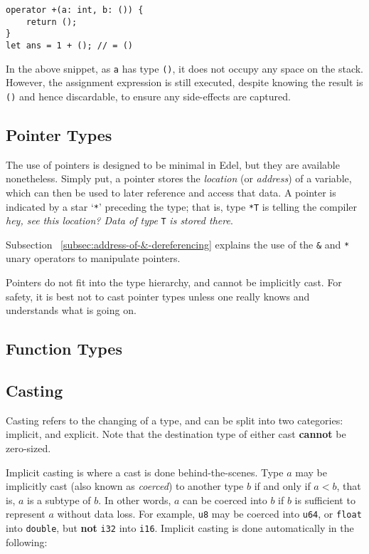\begin{lstlisting}[language=CustomLang]
operator +(a: int, b: ()) {
    return ();
}
let ans = 1 + (); // = ()
\end{lstlisting}

In the above snippet, as \texttt{a} has type \texttt{()}, it does not occupy any space on the stack.
However, the assignment expression is still executed, despite knowing the result is \texttt{()} and hence discardable, to ensure any side-effects are captured.

\subsection{Pointer Types}\label{subsec:pointer-types}

The use of pointers is designed to be minimal in Edel, but they are available nonetheless.
Simply put, a pointer stores the \textit{location} (or \textit{address}) of a variable, which can then be used to later reference and access that data.
A pointer is indicated by a star `\texttt{*}' preceding the type;
that is, type \texttt{*T} is telling the compiler \textit{hey, see this location? Data of type} \texttt{T} \textit{is stored there}.

Subsection ~\ref{subsec:address-of-&-dereferencing} explains the use of the \texttt{\&} and \texttt{*} unary operators to manipulate pointers.

Pointers do not fit into the type hierarchy, and cannot be implicitly cast.
For safety, it is best not to cast pointer types unless one really knows and understands what is going on.

\subsection{Function Types}\label{subsec:function-types}


\subsection{Casting}\label{subsec:type-casting}

Casting refers to the changing of a type, and can be split into two categories: implicit, and explicit.
Note that the destination type of either cast \textbf{cannot} be zero-sized.

Implicit casting is where a cast is done behind-the-scenes.
Type \(a\) may be implicitly cast (also known as \textit{coerced}) to another type \(b\) if and only if \(a < b\), that is, \(a\) is a subtype of \(b\).
In other words, \(a\) can be coerced into \(b\) if \(b\) is sufficient to represent \(a\) without data loss.
For example, \texttt{u8} may be coerced into \texttt{u64}, or \texttt{float} into \texttt{double}, but \textbf{not} \texttt{i32} into \texttt{i16}.
Implicit casting is done automatically in the following:

